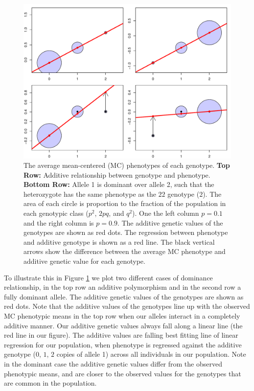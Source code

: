 \begin{figure}
\begin{center}
\includegraphics[width=\textwidth]{figures/additive_effect.pdf}
\end{center}
\caption{The average mean-centered (MC) phenotypes of each genotype. 
{\bf Top Row:} Additive relationship between genotype and phenotype. 
{\bf Bottom Row:} Allele 1 is dominant over allele 2, such that the
heterozygote has the same phenotype as the $22$ genotype ($2$). 
The area of each circle is proportion to the fraction of
the population in each genotypic class ($p^2$, $2pq$, and $q^2$). 
One the left column $p=0.1$ and the right column is $p=0.9$.
The additive genetic values of the genotypes are shown as
  red dots. The regression between phenotype and additive genotype is
  shown as a red line. The black vertical arrows show the difference
between the average MC phenotype and additive genetic value for each genotype. } \label{fig:add_dom}
\end{figure}


To illustrate this in Figure \ref{fig:add_dom} we plot two different cases of dominance
relationship, in the top row an additive polymorphism and in the second
row a fully dominant allele. The additive genetic values of the genotypes are shown as red dots. Note that the additive values of the genotypes line up with
the observed MC phenotypic means in the top row when our alleles interact in a
completely additive manner. Our additive genetic values always fall along a
linear line (the red line in our figure). The additive values are falling best
fitting line of linear regression for our population, when phenotype is
regressed against the additive genotype ($0$, $1$, $2$ copies of allele 1)
across all individuals in our population. Note in the dominant case the
additive genetic values differ from the observed phenotypic means, and are
closer to the observed values for the genotypes that are common in the
population. \\


